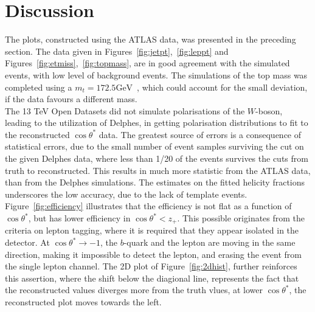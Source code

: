 \documentclass[12pt,a4paper]{article}
\numberwithin{equation}{section}
\begin{document}


\section{Discussion}
The plots, constructed using the ATLAS data, was presented in the preceding
section. The data given in Figures~\ref{fig:jetpt},~\ref{fig:leppt} and
Figures~\ref{fig:etmiss},~\ref{fig:topmass}, are in good agreement with the
simulated events, with low level of background events. The simulations of the
top mass was completed using a $m_t = 172.5 \mathrm{GeV}$~\cite{oreach2020},
which could account for the small deviation, if the data favours a different
mass.\\

The 13 TeV Open Datasets did not simulate polarisations of the $W$-boson,
leading to the utilization of Delphes, in getting polarisation distributions to
fit to the reconstructed $\cos \theta^{*}$ data. The greatest source of errors is a
consequence of statistical errors, due to the small number of event samples
surviving the cut on the given Delphes data, where less than 1/20 of the events
survives the cuts from truth to reconstructed. This results in much more
statistic from the ATLAS data, than from the Delphes simulations. The estimates
on the fitted helicity fractions underscores the low accuracy, due to the lack
of template events.\\

Figure~\ref{fig:efficiency} illustrates that the efficiency is not flat as a
function of $\cos \theta^{*}$, but has lower efficiency in $\cos \theta^{*} < z_+$. This
possible originates from the criteria on lepton tagging, where it is required
that they appear isolated in the detector. At $\cos \theta^{*} \rightarrow -1$, the $b$-quark
and the lepton are moving in the same direction, making it impossible to detect
the lepton, and erasing the event from the single lepton channel. The 2D plot of
Figure~\ref{fig:2dhist}, further reinforces this assertion, where the shift
below the diagional line, represents the fact that the reconstructed values
diverges more from the truth vlues, at lower $\cos \theta^{*}$, the reconstructed
plot moves towards the left.\\
\end{document}
